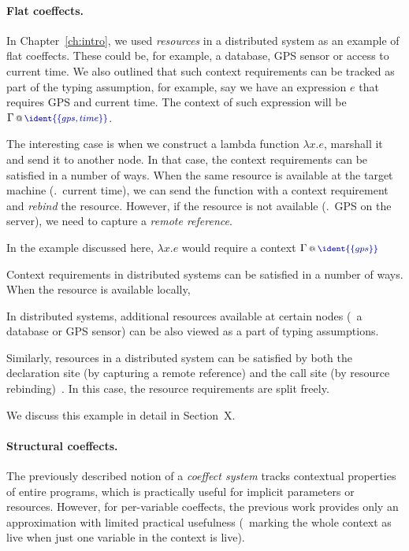 \paragraph{Flat coeffects.}

In Chapter~\ref{ch:intro}, we used \emph{resources} in a distributed system as an example of flat
coeffects. These could be, for example, a database, GPS sensor or access to current time.
We also outlined that such context requirements can be tracked as part of the typing assumption,
for example, say we have an expression $e$ that requires GPS and current time. The context of
such expression will be $\coctx{\Gamma}{ \aclrd{\ident{\{ gps, time \}}} }$.

The interesting case is when we construct a lambda function $\lambda x.e$, marshall it and
send it to another node. In that case, the context requirements can be satisfied in a number of
ways. When the same resource is available at the target machine (\eg.~current time), we can
send the function with a context requirement and \emph{rebind} the resource. However, if the
resource is not available (\eg.~GPS on the server), we need to capture a \emph{remote reference}.

In the example discussed here, $\lambda x.e$ would require a context 
$\coctx{\Gamma}{ \aclrd{\ident{\{ gps \}}} }$

Context requirements in distributed systems can be satisfied in a number of ways. When the 
resource is available locally, 

In distributed 
systems, additional resources available at certain nodes (\eg~a database or GPS sensor) can be 
also viewed as a part of typing assumptions. 

Similarly, resources in a distributed system can be satisfied by both the declaration site (by 
capturing a remote reference) and the call site (by resource rebinding)~\cite{app-distributed-acute}. 
In this case, the resource requirements are split freely. 

We discuss this example in detail in Section~X. 

\paragraph{Structural coeffects.}

The previously described notion of a \emph{coeffect system} \cite{petricek2013coeffects} tracks
contextual properties of entire programs, which is practically useful for implicit parameters 
or resources. However, for per-variable coeffects, the previous work provides only an approximation 
with limited practical usefulness (\eg~marking the whole context as live when just one 
variable in the context is live).

